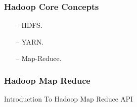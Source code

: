 
\begin{frame}[c]{ }
	\frametitle{Hadoop Core Concepts }
	
	
	\begin{itemize}  [<+->]
		\item [--] HDFS.
		\item [--] YARN.
		\item [--] Map-Reduce.
		
	\end{itemize}
\end{frame}
\begin{frame}[c]{ }
	\frametitle{ Hadoop Map Reduce}
	\centering     
	
	\textcolor{offgreen}{ \large Introduction To Hadoop Map Reduce API}
\end{frame}

